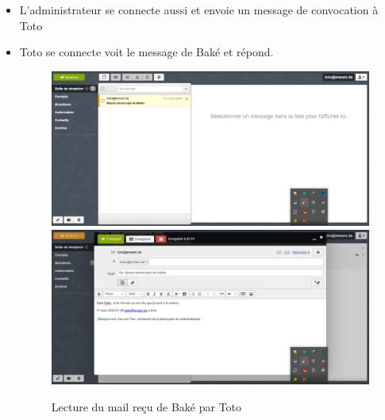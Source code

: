 \documentclass[a4paper,12pt,french]{report} %
\begin{document}
\begin{itemize}
\item L'administrateur se connecte aussi et envoie un message de convocation à Toto 
\item Toto se connecte voit le message de Baké et répond.
\begin{figure}[H]
\centering
\includegraphics[width=483pt]{figure/toto_see_mail_from_bake1.png} \\[1cm]
\includegraphics[width=483pt]{figure/toto_reply_to_bake1.png}
\caption{Lecture du mail reçu de Baké par Toto}
\end{figure} 


\end{itemize}
\end{document}
